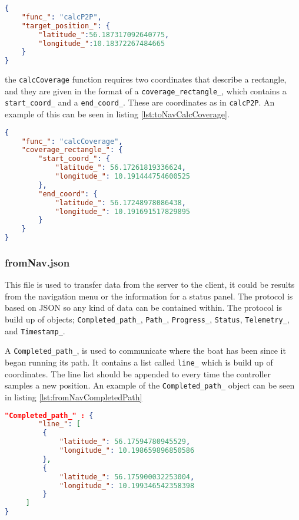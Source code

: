 \begin{lstlisting}[caption = {Example of a calcP2P call in the toNav.json}, captionpos=b, label={lst:toNavCalcP2P}, language=json,firstnumber=1]
{
	"func_": "calcP2P",
	"target_position_": {
		"latitude_":56.187317092640775,
		"longitude_":10.18372267484665
	}
}
\end{lstlisting}

the \texttt{calcCoverage} function requires two coordinates that describe a rectangle, and they are given in the format of a \texttt{coverage_rectangle_}, which contains a \texttt{start_coord_} and a \texttt{end_coord_}. These are coordinates as in \texttt{calcP2P}. An example of this can be seen in listing \ref{lst:toNavCalcCoverage}.

\begin{lstlisting}[caption = {Example of a calcCoverage call in the toNav.JSON}, captionpos=b, label={lst:toNavCalcCoverage}, language=json,firstnumber=1]
{
	"func_": "calcCoverage",
	"coverage_rectangle_": {
		"start_coord_": {
			"latitude_": 56.17261819336624,
			"longitude_": 10.191444754600525
		},
		"end_coord": {
			"latitude_": 56.17248978086438,
			"longitude_": 10.191691517829895
		}
	}
}
\end{lstlisting}

\subsubsection{fromNav.json}
\label{sec:protocol_fromNav}
This file is used to transfer data from the server to the client, it could be results from the navigation menu or the information for a status panel. 
The protocol is based on JSON so any kind of data can be contained within. The protocol is build up of objects;  \texttt{Completed_path_}, \texttt{Path_}, \texttt{Progress_}, \texttt{Status}, \texttt{Telemetry_}, and \texttt{Timestamp_}.

A \texttt{Completed_path_}, is used to communicate where the boat has been since it began running its path. It contains a list called \texttt{line_} which is build up of coordinates.
The line list should be appended to every time the controller samples a new position. An example of the \texttt{Completed_path_} object can be seen in listing \ref{lst:fromNavCompletedPath}

\begin{lstlisting}[caption = {Example of a Completed_path_ object in fromNav.json}, captionpos=b, label={lst:fromNavCompletedPath}, language=json,firstnumber=1]
"Completed_path_" : {
		"line_": [
         {
             "latitude_": 56.17594780945529,
             "longitude_": 10.198659896850586
         },
         {
             "latitude_": 56.175900032253004,
             "longitude_": 10.199346542358398
         }
     ]
}
\end{lstlisting}

